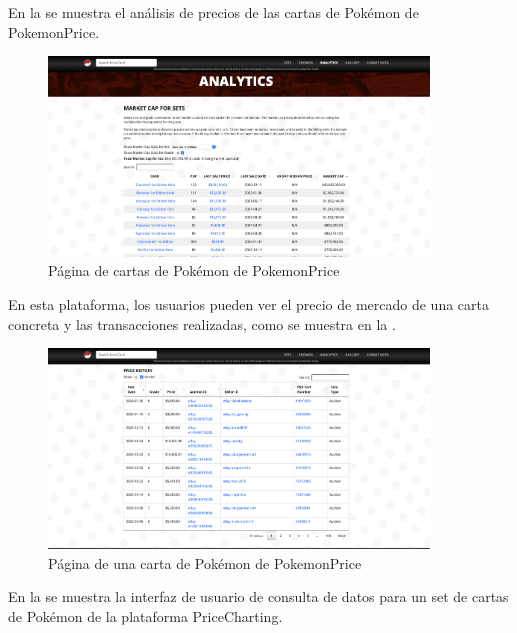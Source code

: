 En la  se muestra el análisis de precios de las cartas de Pokémon de PokemonPrice.

\begin{figure}[H]
    \centering
    \includegraphics[width=0.9\textwidth]{figures/4-Estudio-viabilidad/4_PokemonPrice.png}
    \caption{Página de cartas de Pokémon de PokemonPrice}
    \label{fig:pokemonprice}
    \hypertarget{fig:pokemonprice}{}
\end{figure}

En esta plataforma, los usuarios pueden ver el precio de mercado de una carta concreta y las transacciones realizadas, como se muestra en la .

\begin{figure}[H]
    \centering
    \includegraphics[width=0.9\textwidth]{figures/4-Estudio-viabilidad/4_PokemonPrice2.png}
    \caption{Página de una carta de Pokémon de PokemonPrice}
    \label{fig:pokemonprice2}
    \hypertarget{fig:pokemonprice2}{}
\end{figure}

En la  se muestra la interfaz de usuario de consulta de datos para un set
 de cartas de Pokémon de la plataforma PriceCharting.

